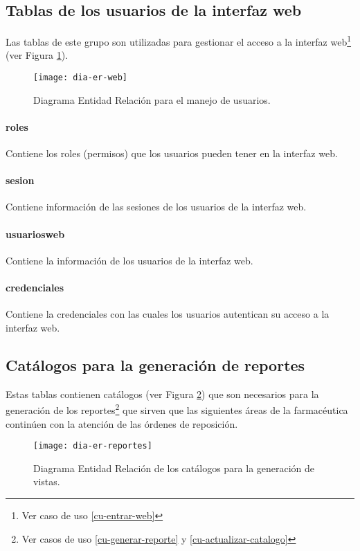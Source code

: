 \subsection{Tablas de los usuarios de la interfaz web}
Las tablas de este grupo son utilizadas para gestionar el acceso a la interfaz web\footnote{Ver caso de uso \ref{cu-entrar-web}} (ver Figura \ref{fig:dia-er-web}).
\begin{figure}[h]
  \centering
  \texttt{[image: dia-er-web]} 
  \caption{Diagrama Entidad Relación para el manejo de usuarios.}
  \label{fig:dia-er-web}
\end{figure}
\paragraph{roles\\}Contiene los roles (permisos) que los usuarios pueden tener en la interfaz web.
\paragraph{sesion\\}Contiene información de las sesiones de los usuarios de la interfaz web.
\paragraph{usuarios{\textunderscore}web\\} Contiene la información de los usuarios de la interfaz web.
\paragraph{credenciales\\} Contiene la credenciales con las cuales los usuarios autentican su acceso a la interfaz web.


\subsection{Catálogos para la generación de reportes}
Estas tablas contienen catálogos (ver Figura \ref{fig:dia-er-reportes}) que son necesarios para la generación de los reportes\footnote{Ver casos de uso \ref{cu-generar-reporte} y \ref{cu-actualizar-catalogo}} que sirven que las siguientes áreas de la farmacéutica continúen con la atención de las órdenes de reposición.
\begin{figure}[h]
  \centering
  \texttt{[image: dia-er-reportes]} 
  \caption{Diagrama Entidad Relación de los catálogos para la generación de vistas.}
  \label{fig:dia-er-reportes}
\end{figure}
